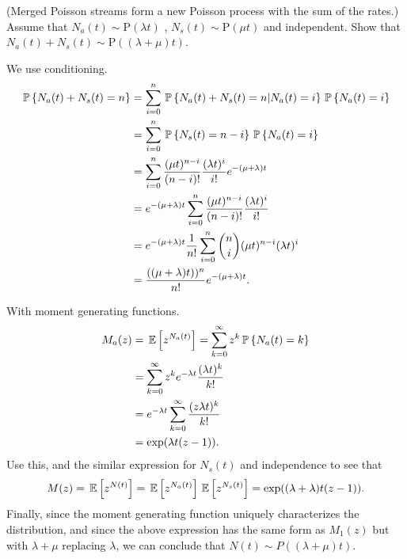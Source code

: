 \begin{question} (Merged Poisson streams form a new Poisson process
  with the sum of the rates.) Assume that
  $N_a(t)\sim \text{P}(\lambda t)$ , $N_s(t) \sim \text{P}(\mu t)$ and
  independent.  Show that
  $N_a(t) + N_s(t) \sim \text{P}((\lambda + \mu)t)$.  


    \begin{solution}
 We use conditioning.
  \begin{equation*}
    \begin{split}
\P{N_a(t) + N_s(t) = n} 
&= \sum_{i=0}^n \P{N_a(t) + N_s(t) = n|N_a(t) = i}\P{N_a(t)=i} \\
&= \sum_{i=0}^n \P{ N_s(t) = n-i}\P{N_a(t)=i} \\
&= \sum_{i=0}^n \frac{(\mu t)^{n-i}}{(n-i)!} \frac{(\lambda t)^i}{i!} e^{-(\mu+\lambda)t} \\
&= e^{-(\mu+\lambda)t} \sum_{i=0}^n \frac{(\mu t)^{n-i}}{(n-i)!} \frac{(\lambda t)^i}{i!}  \\
&= e^{-(\mu+\lambda)t}\frac 1{n!} \sum_{i=0}^n {n \choose i }(\mu t)^{n-i}(\lambda t)^i  \\
&= \frac{((\mu+\lambda)t))^n}{n!}e^{-(\mu+\lambda)t}.
    \end{split}
  \end{equation*}

  With moment generating functions.
      \begin{equation*}
        \begin{split}
          M_a(z) 
&= \E{z^{N_a(t)}} = \sum_{k=0}^\infty z^k \P{N_a(t) = k} \\
&= \sum_{k=0}^\infty z^k e^{-\lambda t} \frac{(\lambda t)^k}{k!} \\
&= e^{-\lambda t} \sum_{k=0}^\infty  \frac{(z \lambda t)^k}{k!} \\
&=\exp(\lambda t (z-1)). 
        \end{split}
      \end{equation*}
      Use this, and the similar expression for $N_s(t)$ and
      independence to see that
\begin{equation*}
M(z) = \E{z^{N(t)}} = \E{z^{N_a(t)}} \E{z^{N_s(t)}} = \exp((\lambda +\lambda)t (z-1)). 
\end{equation*}
Finally, since the moment generating function uniquely characterizes
the distribution, and since the above expression has the same form as
$M_1(z)$ but with $\lambda+\mu$ replacing $\lambda$, we can conclude that $N(t)\sim P((\lambda +\mu) t)$.
    \end{solution}
\end{question}


